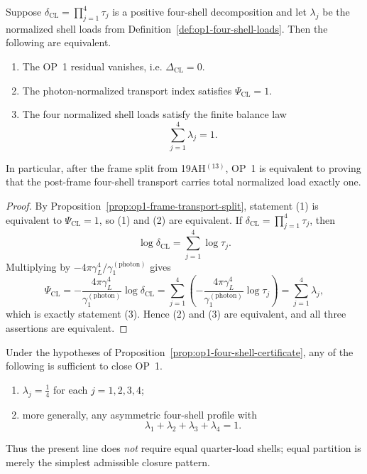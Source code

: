 \begin{proposition}
\label{prop:op1-four-shell-certificate}
Suppose \(\delta_{\mathrm{CL}}=\prod_{j=1}^4 \tau_j\) is a positive four-shell decomposition and let \(\lambda_j\) be the normalized shell loads from Definition~\ref{def:op1-four-shell-loads}. Then the following are equivalent.
\begin{enumerate}[leftmargin=2em]
  \item The OP~1 residual vanishes, i.e. \(\Delta_{\mathrm{CL}}=0\).
  \item The photon-normalized transport index satisfies \(\Psi_{\mathrm{CL}}=1\).
  \item The four normalized shell loads satisfy the finite balance law
  \[
    \sum_{j=1}^4 \lambda_j = 1.
  \]
\end{enumerate}
In particular, after the frame split from 19AH$^{(13)}$, OP~1 is equivalent to proving that the post-frame four-shell transport carries total normalized load exactly one.
\end{proposition}

\begin{proof}
By Proposition~\ref{prop:op1-frame-transport-split}, statement (1) is equivalent to \(\Psi_{\mathrm{CL}}=1\), so (1) and (2) are equivalent. If \(\delta_{\mathrm{CL}}=\prod_{j=1}^4 \tau_j\), then
\[
  \log \delta_{\mathrm{CL}} = \sum_{j=1}^4 \log \tau_j.
\]
Multiplying by \(-4\pi\gamma_L^4/\gamma_1^{(\mathrm{photon})}\) gives
\[
  \Psi_{\mathrm{CL}}
  = -\frac{4\pi\gamma_L^4}{\gamma_1^{(\mathrm{photon})}}\log \delta_{\mathrm{CL}}
  = \sum_{j=1}^4 \left(-\frac{4\pi\gamma_L^4}{\gamma_1^{(\mathrm{photon})}}\log \tau_j\right)
  = \sum_{j=1}^4 \lambda_j,
\]
which is exactly statement (3). Hence (2) and (3) are equivalent, and all three assertions are equivalent.
\end{proof}

\begin{corollary}
\label{cor:op1-quarter-shells}
Under the hypotheses of Proposition~\ref{prop:op1-four-shell-certificate}, any of the following is sufficient to close OP~1.
\begin{enumerate}[leftmargin=2em]
  \item \(\lambda_j=\tfrac14\) for each \(j=1,2,3,4\);
  \item more generally, any asymmetric four-shell profile with
  \[
    \lambda_1+\lambda_2+\lambda_3+\lambda_4 = 1.
  \]
\end{enumerate}
Thus the present line does \emph{not} require equal quarter-load shells; equal partition is merely the simplest admissible closure pattern.
\end{corollary}



